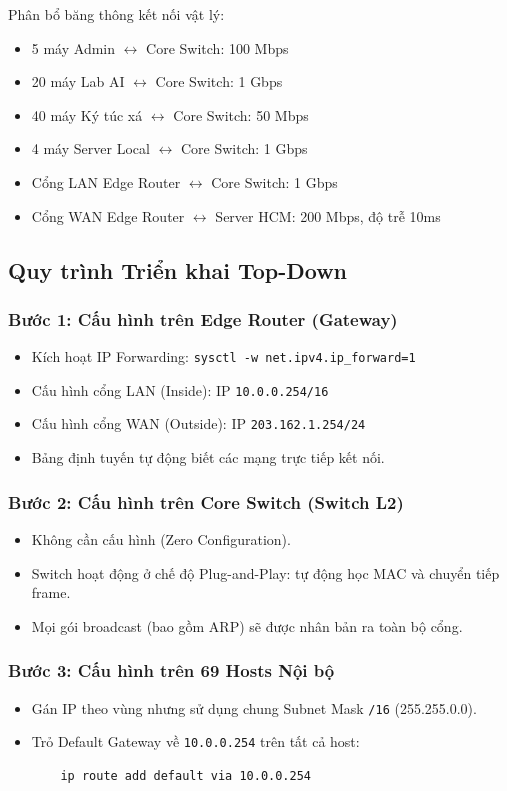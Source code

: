 Phân bổ băng thông kết nối vật lý:
\begin{itemize}
    \item 5 máy Admin $\leftrightarrow$ Core Switch: 100 Mbps
    \item 20 máy Lab AI $\leftrightarrow$ Core Switch: 1 Gbps
    \item 40 máy Ký túc xá $\leftrightarrow$ Core Switch: 50 Mbps
    \item 4 máy Server Local $\leftrightarrow$ Core Switch: 1 Gbps
    \item Cổng LAN Edge Router $\leftrightarrow$ Core Switch: 1 Gbps
    \item Cổng WAN Edge Router $\leftrightarrow$ Server HCM: 200 Mbps, độ trễ 10ms
\end{itemize}

\subsection{Quy trình Triển khai Top-Down}

\subsubsection{Bước 1: Cấu hình trên Edge Router (Gateway)}
\begin{itemize}
    \item Kích hoạt IP Forwarding: \texttt{sysctl -w net.ipv4.ip\_forward=1}
    \item Cấu hình cổng LAN (Inside): IP \texttt{10.0.0.254/16}
    \item Cấu hình cổng WAN (Outside): IP \texttt{203.162.1.254/24}
    \item Bảng định tuyến tự động biết các mạng trực tiếp kết nối.
\end{itemize}

\subsubsection{Bước 2: Cấu hình trên Core Switch (Switch L2)}
\begin{itemize}
    \item Không cần cấu hình (Zero Configuration).
    \item Switch hoạt động ở chế độ Plug-and-Play: tự động học MAC và chuyển tiếp frame.
    \item Mọi gói broadcast (bao gồm ARP) sẽ được nhân bản ra toàn bộ cổng.
\end{itemize}

\subsubsection{Bước 3: Cấu hình trên 69 Hosts Nội bộ}
\begin{itemize}
    \item Gán IP theo vùng nhưng sử dụng chung Subnet Mask \texttt{/16} (255.255.0.0).
    \item Trỏ Default Gateway về \texttt{10.0.0.254} trên tất cả host:
    \begin{verbatim}
    ip route add default via 10.0.0.254
    \end{verbatim}
\end{itemize}

